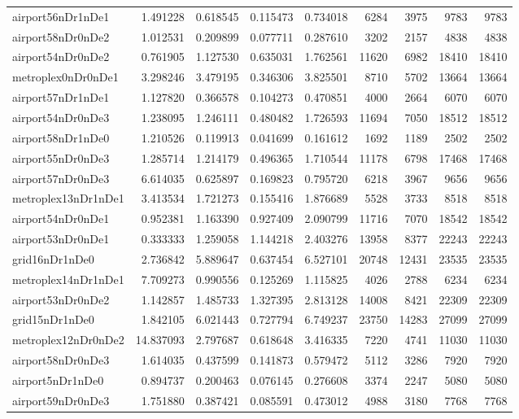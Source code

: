 \begin{longtable}{|l|r|r|r|r|r|r|r|r|}
airport56nDr1nDe1 & 1.491228 & 0.618545 & 0.115473 & 0.734018 & 6284 & 3975 & 9783 & 9783 \\
airport58nDr0nDe2 & 1.012531 & 0.209899 & 0.077711 & 0.287610 & 3202 & 2157 & 4838 & 4838 \\
airport54nDr0nDe2 & 0.761905 & 1.127530 & 0.635031 & 1.762561 & 11620 & 6982 & 18410 & 18410 \\
metroplex0nDr0nDe1 & 3.298246 & 3.479195 & 0.346306 & 3.825501 & 8710 & 5702 & 13664 & 13664 \\
airport57nDr1nDe1 & 1.127820 & 0.366578 & 0.104273 & 0.470851 & 4000 & 2664 & 6070 & 6070 \\
airport54nDr0nDe3 & 1.238095 & 1.246111 & 0.480482 & 1.726593 & 11694 & 7050 & 18512 & 18512 \\
airport58nDr1nDe0 & 1.210526 & 0.119913 & 0.041699 & 0.161612 & 1692 & 1189 & 2502 & 2502 \\
airport55nDr0nDe3 & 1.285714 & 1.214179 & 0.496365 & 1.710544 & 11178 & 6798 & 17468 & 17468 \\
airport57nDr0nDe3 & 6.614035 & 0.625897 & 0.169823 & 0.795720 & 6218 & 3967 & 9656 & 9656 \\
metroplex13nDr1nDe1 & 3.413534 & 1.721273 & 0.155416 & 1.876689 & 5528 & 3733 & 8518 & 8518 \\
airport54nDr0nDe1 & 0.952381 & 1.163390 & 0.927409 & 2.090799 & 11716 & 7070 & 18542 & 18542 \\
airport53nDr0nDe1 & 0.333333 & 1.259058 & 1.144218 & 2.403276 & 13958 & 8377 & 22243 & 22243 \\
grid16nDr1nDe0 & 2.736842 & 5.889647 & 0.637454 & 6.527101 & 20748 & 12431 & 23535 & 23535 \\
metroplex14nDr1nDe1 & 7.709273 & 0.990556 & 0.125269 & 1.115825 & 4026 & 2788 & 6234 & 6234 \\
airport53nDr0nDe2 & 1.142857 & 1.485733 & 1.327395 & 2.813128 & 14008 & 8421 & 22309 & 22309 \\
grid15nDr1nDe0 & 1.842105 & 6.021443 & 0.727794 & 6.749237 & 23750 & 14283 & 27099 & 27099 \\
metroplex12nDr0nDe2 & 14.837093 & 2.797687 & 0.618648 & 3.416335 & 7220 & 4741 & 11030 & 11030 \\
airport58nDr0nDe3 & 1.614035 & 0.437599 & 0.141873 & 0.579472 & 5112 & 3286 & 7920 & 7920 \\
airport5nDr1nDe0 & 0.894737 & 0.200463 & 0.076145 & 0.276608 & 3374 & 2247 & 5080 & 5080 \\
airport59nDr0nDe3 & 1.751880 & 0.387421 & 0.085591 & 0.473012 & 4988 & 3180 & 7768 & 7768 \\

\end{longtable}
